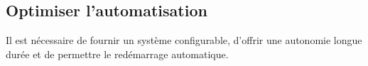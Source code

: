 

\subsection{Optimiser l’automatisation}
\label{s:beo_obj_automat}

Il est nécessaire de fournir un système configurable, d'offrir une autonomie longue durée et de permettre le redémarrage automatique.